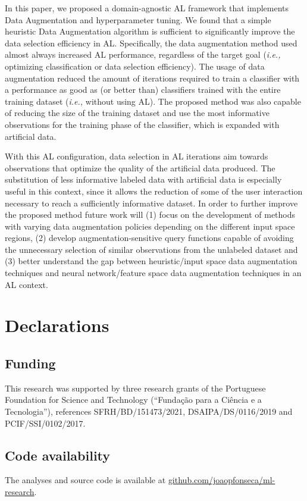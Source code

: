 \documentclass[preprint, 12pt]{elsarticle}
\begin{document}
In this paper, we proposed a domain-agnostic AL framework that implements Data
Augmentation and hyperparameter tuning. We found that a simple heuristic Data
Augmentation algorithm is sufficient to significantly improve the data
selection efficiency in AL\@. Specifically, the data augmentation method used
almost always increased AL performance, regardless of the target goal
(\textit{i.e.,} optimizing classification or data selection efficiency). The
usage of data augmentation reduced the amount of iterations required to train
a classifier with a performance as good as (or better than) classifiers
trained with the entire training dataset (\textit{i.e.,} without using AL).
The proposed method was also capable of reducing the size of the training
dataset and use the most informative observations for the training phase of
the classifier, which is expanded with artificial data. 

With this AL configuration, data selection in AL iterations aim towards
observations that optimize the quality of the artificial data produced. The
substitution of less informative labeled data with artificial data is
especially useful in this context, since it allows the reduction of some of
the user interaction necessary to reach a sufficiently informative dataset.
In order to further improve the proposed method future work will (1) focus on
the development of methods with varying data augmentation policies depending
on the different input space regions, (2) develop augmentation-sensitive query
functions capable of avoiding the unnecessary selection of similar
observations from the unlabeled dataset and (3) better understand the gap
between heuristic/input space data augmentation techniques and neural
network/feature space data augmentation techniques in an AL context.

\section*{Declarations}

\subsection*{Funding}

This research was supported by three research grants of the Portuguese Foundation
for Science and Technology (``Fundação para a Ciência e a Tecnologia''),
references SFRH/BD/151473/2021, DSAIPA/DS/0116/2019 and PCIF/SSI/0102/2017.

\subsection*{Code availability}

The analyses and source code is available at
\href{https://github.com/joaopfonseca/ml-research}{github.com/joaopfonseca/ml-research}.



\end{document}
